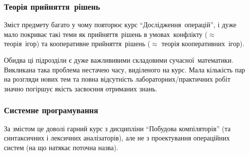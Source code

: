 \documentclass[14pt, a4paper]{extarticle}  %
\begin{document}
\subsubsection{Теорія прийняття~рішень}
Зміст предмету багато у чому повторює курс ``Дослідження~операцій'', і дуже мало покриває такі теми як прийняття~рішень в умовах~конфлікту ($\approx$ теорія~ігор) та кооперативне прийняття~рішень ($\approx$ теорія кооперативних~ігор). 

Обидва ці підрозділи є  дуже важлививими складовими сучасної~математики. %
Викликана така проблема нестачею часу, виділеного на курс.
Мала кількість пар на розгляди нових тем та повна відсутність лабораторних/практичних робіт значно погіршує якість засвоєння отриманих знань. 







\subsubsection{Системне програмування}

За змістом це доволі гарний курс з дисципліни ``Побудова компіляторів'' (та синтаксичних і лексичних аналізаторів), але не з проектування операційних систем (на що натякає поточна назва). 
\end{document}
